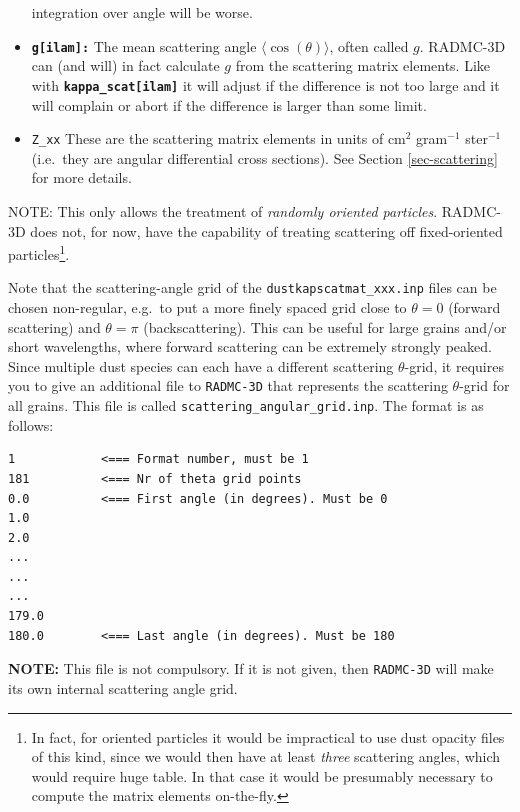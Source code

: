 \documentclass{report}
\newenvironment{asciibox}%
  {\begin{list}{}{%
    \setlength{\topsep}{0.5em}%
    \setlength{\parskip}{0em}%
    \setlength{\parsep}{0em}%
    \setlength{\itemsep}{0em}%
    \setlength{\rightmargin}{0em}%
    \setlength{\leftmargin}{3.0em}%
    \setlength{\labelsep}{1em}%
    \setlength{\labelwidth}{2em}%
  }\normalfont\footnotesize\item}
  {\end{list}}
\begin{document}
\begin{itemize}
  integration over angle will be worse.
\item[] {\small\tt\bf g[ilam]:} The mean scattering angle
  $\langle\cos(\theta)\rangle$, often called $g$. RADMC-3D can (and will) in
  fact calculate $g$ from the scattering matrix elements. Like with
  {\small\tt\bf kappa\_scat[ilam]} it will adjust if the difference is not
  too large and it will complain or abort if the difference is larger than
  some limit.
\item[] {\small\tt Z\_{xx}} These are the scattering matrix elements
  in units of cm$^2$ gram$^{-1}$ ster$^{-1}$ (i.e.\ they are angular
  differential cross sections). See Section \ref{sec-scattering} for
  more details.
\end{itemize}

NOTE: This only allows the treatment of {\em randomly oriented
  particles}. RADMC-3D does not, for now, have the capability of treating
scattering off fixed-oriented particles\footnote{In fact, for oriented
  particles it would be impractical to use dust opacity files of this kind,
  since we would then have at least {\em three} scattering angles, which
  would require huge table. In that case it would be presumably necessary to
  compute the matrix elements on-the-fly.}.

Note that the scattering-angle grid of the {\small\tt dustkapscatmat\_xxx.inp}
files can be chosen non-regular, e.g.\ to put a more finely spaced grid
close to $\theta=0$ (forward scattering) and $\theta=\pi$ (backscattering).
This can be useful for large grains and/or short wavelengths, where forward
scattering can be extremely strongly peaked. Since multiple dust species
can each have a different scattering $\theta$-grid, it requires you to
give an additional file to {\small\tt RADMC-3D} that represents the 
scattering $\theta$-grid for all grains. This file is called 
{\small\tt scattering\_angular\_grid.inp}. The format is as follows:
\begin{asciibox}\begin{verbatim}
1            <=== Format number, must be 1
181          <=== Nr of theta grid points
0.0          <=== First angle (in degrees). Must be 0
1.0          
2.0          
...
...
...
179.0        
180.0        <=== Last angle (in degrees). Must be 180
\end{verbatim}\end{asciibox}
{\bf NOTE:} This file is not compulsory. If it is not given, then 
{\small\tt RADMC-3D} will make its own internal scattering angle grid.
\end{document}
